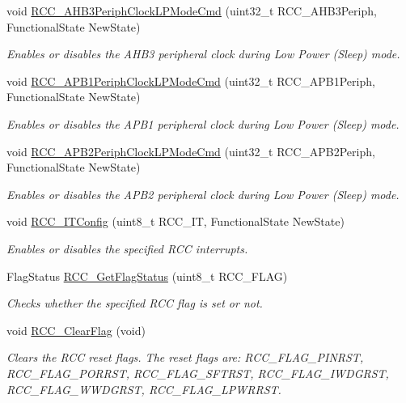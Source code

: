 \begin{DoxyCompactItemize}
void \hyperlink{group___r_c_c_ga4e1df07cdfd81c068902d9d35fcc3911}{R\-C\-C\-\_\-\-A\-H\-B3\-Periph\-Clock\-L\-P\-Mode\-Cmd} (uint32\-\_\-t R\-C\-C\-\_\-\-A\-H\-B3\-Periph, Functional\-State New\-State)
\begin{DoxyCompactList}\small\item\em Enables or disables the A\-H\-B3 peripheral clock during Low Power (Sleep) mode. \end{DoxyCompactList}\item 
void \hyperlink{group___r_c_c_ga84dd64badb84768cbcf19e241cadff50}{R\-C\-C\-\_\-\-A\-P\-B1\-Periph\-Clock\-L\-P\-Mode\-Cmd} (uint32\-\_\-t R\-C\-C\-\_\-\-A\-P\-B1\-Periph, Functional\-State New\-State)
\begin{DoxyCompactList}\small\item\em Enables or disables the A\-P\-B1 peripheral clock during Low Power (Sleep) mode. \end{DoxyCompactList}\item 
void \hyperlink{group___r_c_c_ga30365b9e0b4c5d7e98c2675c862ddd7e}{R\-C\-C\-\_\-\-A\-P\-B2\-Periph\-Clock\-L\-P\-Mode\-Cmd} (uint32\-\_\-t R\-C\-C\-\_\-\-A\-P\-B2\-Periph, Functional\-State New\-State)
\begin{DoxyCompactList}\small\item\em Enables or disables the A\-P\-B2 peripheral clock during Low Power (Sleep) mode. \end{DoxyCompactList}\item 
void \hyperlink{group___r_c_c_gaa953aa226e9ce45300d535941e4dfe2f}{R\-C\-C\-\_\-\-I\-T\-Config} (uint8\-\_\-t R\-C\-C\-\_\-\-I\-T, Functional\-State New\-State)
\begin{DoxyCompactList}\small\item\em Enables or disables the specified R\-C\-C interrupts. \end{DoxyCompactList}\item 
Flag\-Status \hyperlink{group___r_c_c_ga2897bdc52f272031c44fb1f72205d295}{R\-C\-C\-\_\-\-Get\-Flag\-Status} (uint8\-\_\-t R\-C\-C\-\_\-\-F\-L\-A\-G)
\begin{DoxyCompactList}\small\item\em Checks whether the specified R\-C\-C flag is set or not. \end{DoxyCompactList}\item 
void \hyperlink{group___r_c_c_ga53f909dbb15a54124419084ebda97d72}{R\-C\-C\-\_\-\-Clear\-Flag} (void)
\begin{DoxyCompactList}\small\item\em Clears the R\-C\-C reset flags. The reset flags are\-: R\-C\-C\-\_\-\-F\-L\-A\-G\-\_\-\-P\-I\-N\-R\-S\-T, R\-C\-C\-\_\-\-F\-L\-A\-G\-\_\-\-P\-O\-R\-R\-S\-T, R\-C\-C\-\_\-\-F\-L\-A\-G\-\_\-\-S\-F\-T\-R\-S\-T, R\-C\-C\-\_\-\-F\-L\-A\-G\-\_\-\-I\-W\-D\-G\-R\-S\-T, R\-C\-C\-\_\-\-F\-L\-A\-G\-\_\-\-W\-W\-D\-G\-R\-S\-T, R\-C\-C\-\_\-\-F\-L\-A\-G\-\_\-\-L\-P\-W\-R\-R\-S\-T. \end{DoxyCompactList}\item 

\end{DoxyCompactItemize}
